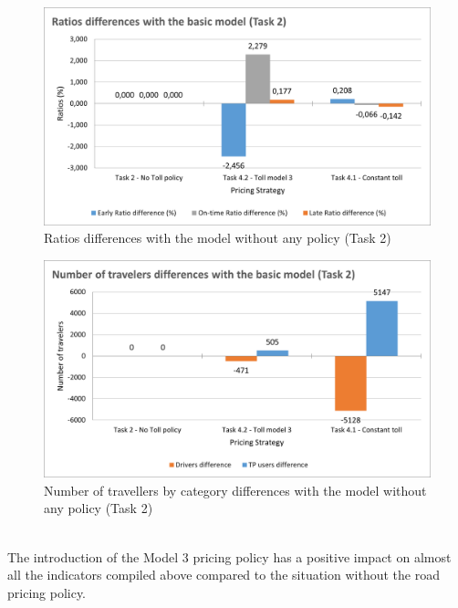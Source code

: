\documentclass[a4paper, 12pt,oneside]{article}
\begin{document}
\begin{minipage}[c]{0.5\textwidth}
\begin{figure}[H]
    \centering
    \includegraphics[width=1\textwidth]{Images/Step4/Ratios.png}
    \caption{Ratios differences with the model without any policy (Task 2)}
    \label{fig:Ratios differences with the model without any policy (Task 2)}
\end{figure}
\end{minipage}
\begin{minipage}[c]{0.5\textwidth}
\begin{figure}[H]
    \centering
    \includegraphics[width=1\textwidth]{Images/Step4/Travelers.png}
    \caption{Number of travellers by category differences with the model without any policy (Task 2)}
    \label{fig:Number of travelers by category differences with the model without any policy (Task 2)}
\end{figure}
\end{minipage}
\\
\newline
The introduction of the Model 3 pricing policy has a positive impact on almost all the indicators compiled above compared to the situation without the road pricing policy.\\
\end{document}
